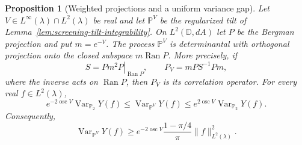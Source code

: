 \documentclass[11pt,a4paper]{article}
\numberwithin{equation}{section}
\newtheorem{proposition}[theorem]{Proposition}
\theoremstyle{definition}
\theoremstyle{remark}
\newcommand{\D}{\mathbb D}
\begin{document}
\begin{proposition}[Weighted projections and a uniform variance gap]
\label{prop:screening-weighted-projection-gap}
Let $V\in L^\infty(\lambda)\cap L^2(\lambda)$ be real and let
$\mathbb P^V$ be the regularized tilt of
Lemma~\ref{lem:screening-tilt-integrability}.  On $L^2(\D,dA)$ let
$P$ be the Bergman projection and put $m=e^{-V}$.  The process
$\mathbb P^V$ is determinantal with orthogonal projection onto the
closed subspace $m\operatorname{Ran}P$.  More precisely, if
\[
 S=\left.Pm^2P\right|_{\operatorname{Ran}P},
 \qquad
 P_V=mP S^{-1}Pm,
\]
where the inverse acts on $\operatorname{Ran}P$, then $P_V$ is its
correlation operator.  For every real $f\in L^2(\lambda)$,
\begin{equation}
 e^{-2\operatorname{osc}V}\operatorname{Var}_{\mathbb P_2}Y(f)
 \le \operatorname{Var}_{\mathbb P^V}Y(f)
 \le e^{2\operatorname{osc}V}\operatorname{Var}_{\mathbb P_2}Y(f).
 \label{eq:screening-weighted-variance-comparison}
\end{equation}
Consequently,
\begin{equation}
 \operatorname{Var}_{\mathbb P^V}Y(f)
 \ge e^{-2\operatorname{osc}V}
          \frac{1-\pi/4}{\pi}\|f\|_{L^2(\lambda)}^2.
 \label{eq:screening-uniform-tilted-gap}
\end{equation}
\end{proposition}
\end{document}
